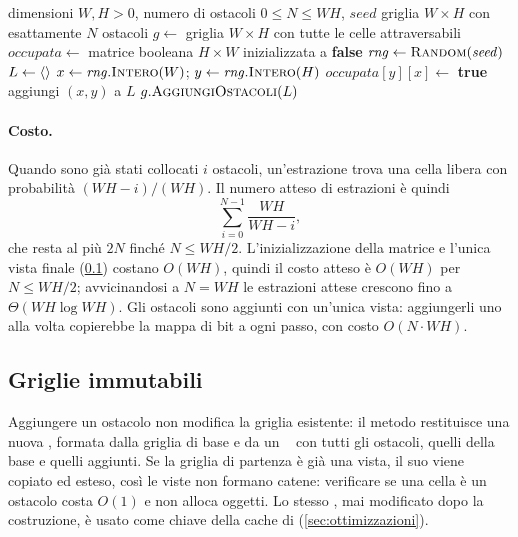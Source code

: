 \begin{algorithm}[H]
\caption{Generazione di una griglia con ostacoli casuali}
\label{alg:genera}
\begin{algorithmic}[1]
\Require dimensioni $W, H > 0$, numero di ostacoli $0 \le N \le WH$, $\mathit{seed}$
\Ensure griglia $W \times H$ con esattamente $N$ ostacoli
  \State $g \gets$ griglia $W \times H$ con tutte le celle attraversabili
  \State $\mathit{occupata} \gets$ matrice booleana $H \times W$ inizializzata a \textbf{false}
  \State $\mathit{rng} \gets \textsc{Random}(\mathit{seed})$
  \State $L \gets \langle  \rangle$ 
    \State $x \gets \mathit{rng}.\textsc{Intero}(W)$; \quad $y \gets \mathit{rng}.\textsc{Intero}(H)$
      \State $\mathit{occupata}[y][x] \gets$ \textbf{true}
      \State aggiungi $(x, y)$ a $L$
    \EndIf
  \EndWhile
  \State \Return $g.\textsc{AggiungiOstacoli}(L)$
\EndProcedure
\end{algorithmic}
\end{algorithm}

\paragraph{Costo.} Quando sono già stati collocati $i$ ostacoli, un'estrazione
trova una cella libera con probabilità $(WH - i)/(WH)$. Il numero atteso di
estrazioni è quindi
\[
  \sum_{i=0}^{N-1} \frac{WH}{WH - i},
\]
che resta al più $2N$ finché $N \le WH/2$. L'inizializzazione della
matrice e l'unica vista finale (\cref{sec:immutabilita}) costano $O(WH)$,
quindi il costo atteso è $O(WH)$ per $N \le WH/2$; avvicinandosi a
$N = WH$ le estrazioni attese crescono fino a $\Theta(WH \log WH)$. Gli
ostacoli sono aggiunti con un'unica vista: aggiungerli uno alla volta
copierebbe la mappa di bit a ogni passo, con costo $O(N \cdot WH)$.

\subsection{Griglie immutabili}
\label{sec:immutabilita}

Aggiungere un ostacolo non modifica la griglia esistente: il metodo
 restituisce una nuova , formata
dalla griglia di base e da un ~\cite{bitset} con tutti gli
ostacoli, quelli della base e quelli aggiunti. Se la griglia di partenza è
già una vista, il suo  viene copiato ed esteso, così le viste
non formano catene: verificare se una cella è un ostacolo costa $O(1)$ e non
alloca oggetti. Lo stesso , mai modificato dopo la
costruzione, è usato come chiave della cache di \cmin{}
(\cref{sec:ottimizzazioni}).

